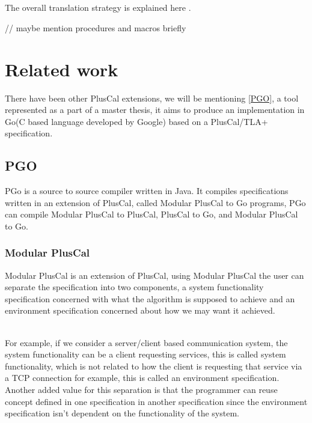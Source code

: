 \documentclass{thesul}
\begin{document}
\hfill\\


\hfill\\
The overall translation strategy is explained here \cite{pcalAlgo}.

// maybe mention procedures and macros briefly
 

\chapter{Related work}

There have been other PlusCal extensions, we will be mentioning \ref{PGO}, a tool represented as a part of a master thesis, it aims to produce an implementation in Go(C based language developed by Google) based on a PlusCal/TLA+ specification.

\section{PGO}

PGo is a source to source compiler written in Java. It compiles specifications written in an extension of PlusCal, called Modular PlusCal to Go programs, PGo can compile Modular PlusCal to PlusCal, PlusCal to Go, and Modular PlusCal to Go.

\subsection{Modular PlusCal}

Modular PlusCal is an extension of PlusCal, using Modular PlusCal the user can separate the specification into two components, a system functionality specification concerned with what the algorithm is supposed to achieve and an environment specification concerned about how we may want it achieved.

\hfill\\

For example, if we consider a server/client based communication system, the system functionality can be a client requesting services, this is called system functionality, which is not related to how the client is requesting that service via a TCP connection for example, this is called an environment specification. Another added value for this separation is that the programmer can reuse concept defined in one specification in another specification since the environment specification isn't dependent on the functionality of the system.
\end{document}

